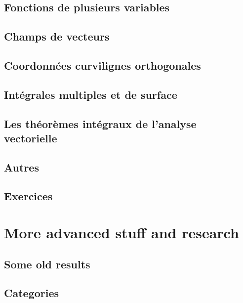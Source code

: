 \chapter{Fonctions de plusieurs variables}


\chapter{Champs de vecteurs}


\chapter{Coordonnées curvilignes orthogonales}


\chapter{Intégrales multiples et de surface}


\chapter{Les théorèmes intégraux de l'analyse vectorielle}


\chapter{Autres}


\chapter{Exercices}


\part{More advanced stuff and research}



\chapter{Some old results}


\chapter{Categories}        \label{chap_category}


